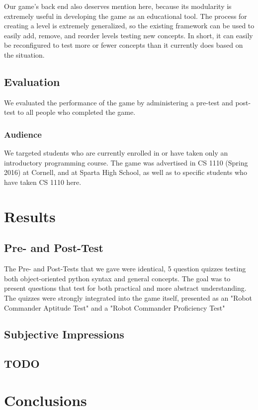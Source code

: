 \documentclass[12pt,notitlepage]{article}
\begin{document}
Our game's back end also deserves mention here, because its modularity is
extremely useful in developing the game as an educational tool. The process for
creating a level is extremely generalized, so the existing framework can
be used to easily add, remove, and reorder levels testing new concepts.
In short, it can easily be reconfigured to test more or fewer concepts than
it currently does based on the situation.

\subsection{Evaluation}

We evaluated the performance of the game by administering a pre-test
and post-test to all people who completed the game.

\subsubsection{Audience}

We targeted students who are currently enrolled in or have taken only
an introductory programming course. The game was advertised in CS 1110
(Spring 2016) at Cornell, and at Sparta High School, as well as
to specific students who have taken CS 1110 here.

\section{Results}

\subsection{Pre- and Post-Test}

The Pre- and Post-Tests that we gave were identical, 5 question quizzes
testing both object-oriented python syntax and general concepts. The goal
was to present questions that test for both practical and more abstract
understanding. The quizzes were strongly integrated into the game itself,
presented as an "Robot Commander Aptitude Test" and a "Robot Commander 
Proficiency Test" 

\subsection{Subjective Impressions}

\subsection{TODO}

\section{Conclusions}
\end{document}
